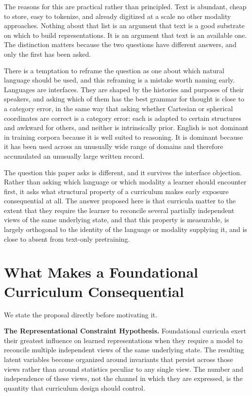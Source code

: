 \documentclass[11pt]{article}
\begin{document}
The reasons for this are practical rather than principled. Text is abundant, cheap to store, easy to tokenize, and already digitized at a scale no other modality approaches. Nothing about that list is an argument that text is a good substrate on which to build representations. It is an argument that text is an available one. The distinction matters because the two questions have different answers, and only the first has been asked.

There is a temptation to reframe the question as one about which natural language should be used, and this reframing is a mistake worth naming early. Languages are interfaces. They are shaped by the histories and purposes of their speakers, and asking which of them has the best grammar for thought is close to a category error, in the same way that asking whether Cartesian or spherical coordinates are correct is a category error: each is adapted to certain structures and awkward for others, and neither is intrinsically prior. English is not dominant in training corpora because it is well suited to reasoning. It is dominant because it has been used across an unusually wide range of domains and therefore accumulated an unusually large written record.

The question this paper asks is different, and it survives the interface objection. Rather than asking which language or which modality a learner should encounter first, it asks what structural property of a curriculum makes early exposure consequential at all. The answer proposed here is that curricula matter to the extent that they require the learner to reconcile several partially independent views of the same underlying state, and that this property is measurable, is largely orthogonal to the identity of the language or modality supplying it, and is close to absent from text-only pretraining.

\section{What Makes a Foundational Curriculum Consequential}
\label{sec:hypothesis}

We state the proposal directly before motivating it.

\textbf{The Representational Constraint Hypothesis.} Foundational curricula exert their greatest influence on learned representations when they require a model to reconcile multiple independent views of the same underlying state. The resulting latent variables become organized around invariants that persist across those views rather than around statistics peculiar to any single view. The number and independence of these views, not the channel in which they are expressed, is the quantity that curriculum design should control.
\end{document}
